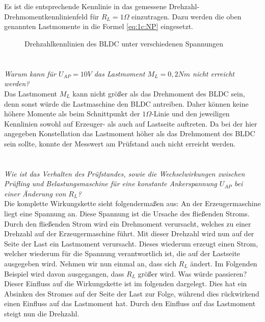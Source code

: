\section{}\label{sec:5b}
Es ist die entsprechende Kennlinie in das gemessene Drehzahl-Drehmomentkennlinienfeld für $ R_{L} = 1\Omega $ einzutragen. Dazu werden die oben genannten Lastmomente in die Formel \ref{eq:1c:NP} eingesetzt.
\begin{figure}[h]
	\centering
	
	\caption{Drehzahlkennlinien des BLDC unter verschiedenen Spannungen}
	\label{fig:5:drehmomente}
\end{figure}

\section{}\label{sec:5c}
\textit{Warum kann für $ U_{AP} = 10V $ das Lastmoment $ M_{L} = 0,2Nm $ nicht erreicht werden?}\\
Das Lastmoment $ M_{L} $ kann nicht größer als das Drehmoment des BLDC sein, denn sonst würde die Lastmaschine den BLDC antreiben. Daher können keine höhere Momente als beim Schnittpunkt der $ 1\Omega $-Linie und den jeweiligen Kennlinien sowohl auf Erzeuger- als auch auf Lastseite auftreten. Da bei der hier angegeben Konstellation das Lastmoment höher als das Drehmoment des BLDC sein sollte, konnte der Messwert am Prüfstand auch nicht erreicht werden.

\section{}\label{sec:5d}
\textit{Wie ist das Verhalten des Prüfstandes, sowie die Wechselwirkungen zwischen Prüfling und Belastungsmaschine für eine konstante Ankerspannung $ U_{AP} $ bei einer Änderung von $ R_{L} $?}\\
Die komplette Wirkungskette sieht folgendermaßen aus: An der Erzeugermaschine liegt eine Spannung an. Diese Spannung ist die Ursache des fließenden Stroms. Durch den fließenden Strom wird ein Drehmoment verursacht, welches zu einer Drehzahl auf der Erzeugermaschine führt. Mit dieser Drehzahl wird nun auf der Seite der Last ein Lastmoment verursacht. Dieses wiederum erzeugt einen Strom, welcher wiederum für die Spannung verantwortlich ist, die auf der Lastseite ausgegeben wird. Nehmen wir nun einmal an, dass sich $ R_{L} $ ändert. Im Folgenden Beispiel wird davon ausgegangen, dass $ R_{L} $ größer wird. Was würde passieren? Dieser Einfluss auf die Wirkungskette ist im folgenden dargelegt. Dies hat ein Absinken des Stromes auf der Seite der Last zur Folge, während dies rückwirkend einen Einfluss auf das Lastmoment hat. Durch den Einfluss auf das Lastmoment steigt nun die Drehzahl.

